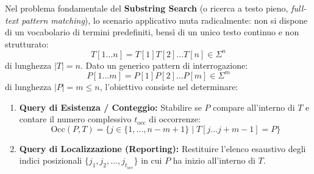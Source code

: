 Nel problema fondamentale del \textbf{Substring Search} (o ricerca a testo pieno, \textit{full-text pattern matching}), lo scenario applicativo muta radicalmente: non si dispone di un vocabolario di termini predefiniti, bens\`i di un unico testo continuo e non strutturato:
\begin{equation}
  T[1 \dots n] = T[1]T[2]\dots T[n] \in \Sigma^n
\end{equation}
di lunghezza $|T| = n$. Dato un generico pattern di interrogazione:
\begin{equation}
  P[1 \dots m] = P[1]P[2]\dots P[m] \in \Sigma^m
\end{equation}
di lunghezza $|P| = m \le n$, l'obiettivo consiste nel determinare:
\begin{enumerate}
  \item \textbf{Query di Esistenza / Conteggio:} Stabilire se $P$ compare all'interno di $T$ e contare il numero complessivo $t_{\text{occ}}$ di occorrenze:
  \begin{equation}
    \text{Occ}(P, T) = \{j \in \{1, \dots, n - m + 1\} \mid T[j \dots j + m - 1] = P\}
  \end{equation}
  \item \textbf{Query di Localizzazione (Reporting):} Restituire l'elenco esaustivo degli indici posizionali $\{j_1, j_2, \dots, j_{t_{\text{occ}}}\}$ in cui $P$ ha inizio all'interno di $T$.
\end{enumerate}

